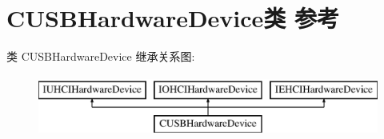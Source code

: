 \hypertarget{class_c_u_s_b_hardware_device}{}\section{C\+U\+S\+B\+Hardware\+Device类 参考}
\label{class_c_u_s_b_hardware_device}
类 C\+U\+S\+B\+Hardware\+Device 继承关系图\+:\begin{figure}[H]
\begin{center}
\leavevmode
\includegraphics[height=2.000000cm]{class_c_u_s_b_hardware_device}
\end{center}
\end{figure}
